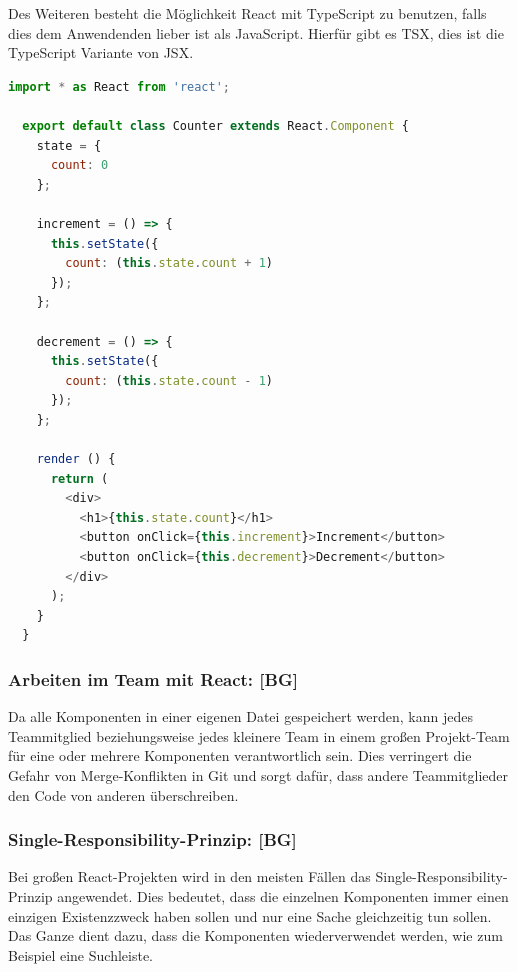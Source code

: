 Des Weiteren besteht die Möglichkeit React mit TypeScript zu benutzen, falls dies dem Anwendenden lieber ist als JavaScript. Hierfür gibt es TSX, dies ist die TypeScript Variante von JSX.

\begin{lstlisting}[language=JavaScript, caption=Beispiel-Code eines Click Counters in TSX label=lst:impl:TSXcounter]
  import * as React from 'react';

  export default class Counter extends React.Component {
    state = {
      count: 0
    };

    increment = () => {
      this.setState({
        count: (this.state.count + 1)
      });
    };

    decrement = () => {
      this.setState({
        count: (this.state.count - 1)
      });
    };

    render () {
      return (
        <div>
          <h1>{this.state.count}</h1>
          <button onClick={this.increment}>Increment</button>
          <button onClick={this.decrement}>Decrement</button>
        </div>
      );
    }
  }
\end{lstlisting} \cite{ReactWithoutJSX2}

\subsubsection{Arbeiten im Team mit React: [BG]}
Da alle Komponenten in einer eigenen Datei gespeichert werden, kann jedes Teammitglied beziehungsweise jedes kleinere Team in einem großen Projekt-Team für eine oder mehrere Komponenten verantwortlich sein. Dies verringert die Gefahr von Merge-Konflikten in Git und sorgt dafür, dass andere Teammitglieder den Code von anderen überschreiben.
\cite{PropsAndComponents2}

\subsubsection{Single-Responsibility-Prinzip: [BG]}
Bei großen React-Projekten wird in den meisten Fällen das Single-Responsibility-Prinzip angewendet. Dies bedeutet, dass die einzelnen Komponenten immer einen einzigen Existenzzweck haben sollen und nur eine Sache gleichzeitig tun sollen. Das Ganze dient dazu, dass die Komponenten wiederverwendet werden, wie zum Beispiel eine Suchleiste.
\cite{SRP}

